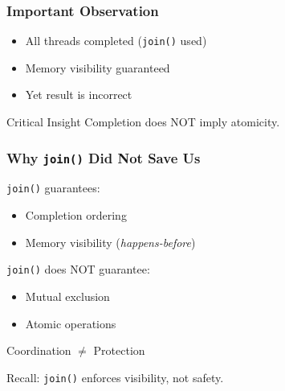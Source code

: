 \documentclass[aspectratio=169,11pt]{beamer}
\begin{document}
	\begin{frame}
		\frametitle{Important Observation}
		\begin{itemize}
			\item All threads completed (\texttt{join()} used)
			\item Memory visibility guaranteed
			\item Yet result is incorrect
		\end{itemize}
		\vspace{5mm}
		\begin{block}{Critical Insight}
			Completion does NOT imply atomicity.
		\end{block}
	\end{frame}
	
	\begin{frame}
		\frametitle{Why \texttt{join()} Did Not Save Us}
		\texttt{join()} guarantees:
		\begin{itemize}
			\item Completion ordering
			\item Memory visibility (\emph{happens-before})
		\end{itemize}
		\vspace{4mm}
		\texttt{join()} does NOT guarantee:
		\begin{itemize}
			\item Mutual exclusion
			\item Atomic operations
		\end{itemize}
		\vspace{4mm}
		\begin{center}
			\Large Coordination $\neq$ Protection
		\end{center}
		\vspace{2mm}
		{\footnotesize Recall: \texttt{join()} enforces visibility, not safety.}
	\end{frame}
	
\end{document}
